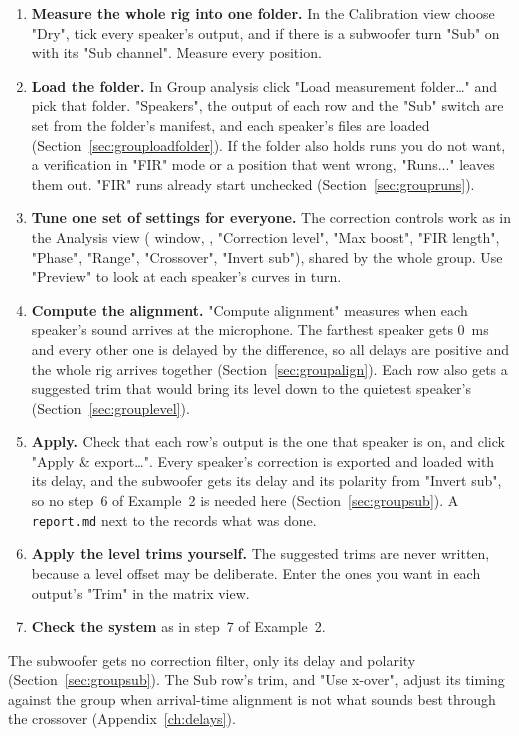 \begin{enumerate}[nosep]
  \item \textbf{Measure the whole rig into one folder.} In the Calibration view choose "Dry", tick every speaker's output, and if there is a subwoofer turn "Sub" on with its "Sub channel". Measure every position.
  \item \textbf{Load the folder.} In Group analysis click "Load measurement folder\ldots" and pick that folder. "Speakers", the output of each row and the "Sub" switch are set from the folder's manifest, and each speaker's files are loaded (Section~\ref{sec:grouploadfolder}). If the folder also holds runs you do not want, a verification in "FIR" mode or a position that went wrong, "Runs..." leaves them out. "FIR" runs already start unchecked (Section~\ref{sec:groupruns}).
  \item \textbf{Tune one set of settings for everyone.} The correction controls work as in the Analysis view ( window, , "Correction level", "Max boost", "FIR length", "Phase", "Range", "Crossover", "Invert sub"), shared by the whole group. Use "Preview" to look at each speaker's curves in turn.
  \item \textbf{Compute the alignment.} "Compute alignment" measures when each speaker's sound arrives at the microphone. The farthest speaker gets \SI{0}{ms} and every other one is delayed by the difference, so all delays are positive and the whole rig arrives together (Section~\ref{sec:groupalign}). Each row also gets a suggested trim that would bring its level down to the quietest speaker's (Section~\ref{sec:grouplevel}).
  \item \textbf{Apply.} Check that each row's output is the one that speaker is on, and click "Apply \& export\ldots". Every speaker's correction is exported and loaded with its delay, and the subwoofer gets its delay and its polarity from "Invert sub", so no step~6 of Example~2 is needed here (Section~\ref{sec:groupsub}). A \texttt{report.md} next to the  records what was done.
  \item \textbf{Apply the level trims yourself.} The suggested trims are never written, because a level offset may be deliberate. Enter the ones you want in each output's "Trim" in the matrix view.
  \item \textbf{Check the system} as in step~7 of Example~2.
\end{enumerate}

\noindent The subwoofer gets no correction filter, only its delay and polarity (Section~\ref{sec:groupsub}). The Sub row's trim, and "Use x-over", adjust its timing against the group when arrival-time alignment is not what sounds best through the crossover (Appendix~\ref{ch:delays}).

